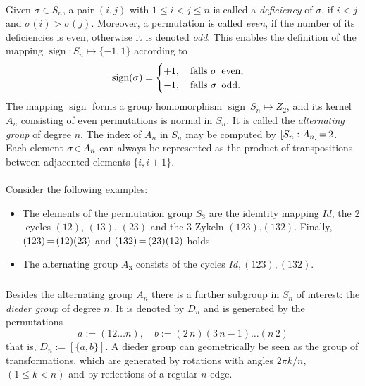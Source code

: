 \documentclass[11pt,twoside]{article}
\begin{document}
\paragraph{}
Given $\sigma \in S_n$,
a pair $(i,j)$ with $1 \leq i < j \leq n$ is called a \textit{deficiency}
of $\sigma$,
if $i< j$ and $\sigma(i) > \sigma(j)$.
Moreover,
a permutation is called \textit{even},
if the number of its deficiencies is even, otherwise it is denoted \textit{odd}.
This enables the definition of the mapping
$\operatorname{sign}: S_n \mapsto \{-1,1\}$ according to
\[
\operatorname{sign}(\sigma) =
\begin{cases}
+1, \quad \mbox{falls } \sigma \, \mbox{ even},\\
-1, \quad \mbox{falls } \sigma \, \mbox{ odd}.
\end{cases}
\]
The mapping $\operatorname{sign}$ forms a group homomorphism
$\operatorname{sign} \: S_n \mapsto Z_2$,
and its kernel $A_n$ consisting of even permutations is normal in $S_n$.
It is called the \textit{alternating group} of degree $n$.
The index of $A_n$ in $S_n$ may be computed by $[S_n:A_n] {\,=\,} 2$.
Each element $\sigma {\,\in\,} A_n$ can always be represented as the product
of transpositions between adjacented elements $\{i,i+1\}$.

\paragraph{}
Consider the following examples:

\begin{itemize}[leftmargin=15pt]
\item[1]
The elements of the permutation group $S_3$ are the idemtity mapping $Id$,
the $2$-cycles $(12)$, $(13)$, $(23)$ and the $3$-Zykeln $(123)$,$(132)$.
Finally, $(123) {\,=\,} (12)(23)$ and $(132) {\,=\,} (23)(12)$ holds.

\item[2]
The alternating group $A_3$ consists of the cycles $Id,(123),(132)$.
\end{itemize}

\subparagraph{}
Besides the alternating group $A_n$ there is a further subgroup in $S_n$
of interest:
the \textit{dieder group} of degree $n$.
It is denoted by $D_n$ and is generated by the permutations
\[
a:=(12\ldots n), \quad b:=(2 \,n)(3\,n-1)\ldots(n\,2)
\]
that is,
$D_n := [ \{a,b\} ]$.
A dieder group can geometrically be seen as the group of transformations,
which are generated by rotations with angles
$2\pi k/n$, $(1 \leq k < n)$ and by reflections of a regular $n$-edge.
\end{document}
